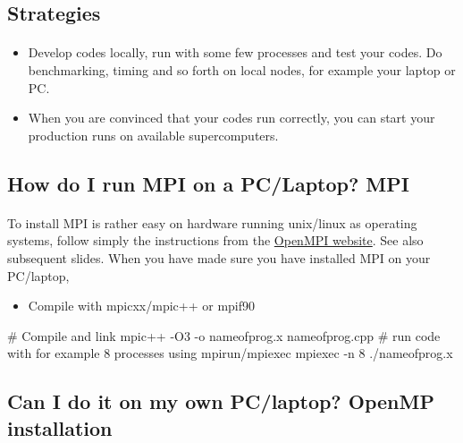 \documentclass[%
oneside,                 %
final,                   %
10pt]{article}
\begin{document}
\subsection{Strategies}

\paragraph{}
\begin{itemize}
\item Develop codes locally, run with some few processes and test your codes.  Do benchmarking, timing and so forth on local nodes, for example your laptop or PC. 

\item When you are convinced that your codes run correctly, you can start your production runs on available supercomputers.
\end{itemize}

\noindent



\subsection{How do I run MPI on a PC/Laptop? MPI}

\paragraph{}
To install MPI is rather easy on hardware running unix/linux as operating systems, follow simply the instructions from the \href{{https://www.open-mpi.org/}}{OpenMPI website}. See also subsequent slides.
When you have made sure you have installed MPI on your PC/laptop, 
\begin{itemize}
\item Compile with mpicxx/mpic++ or mpif90
\end{itemize}

\noindent





\bcppcod
  # Compile and link
  mpic++ -O3 -o nameofprog.x nameofprog.cpp
  #  run code with for example 8 processes using mpirun/mpiexec
  mpiexec -n 8 ./nameofprog.x

\ecppcod



\subsection{Can I do it on my own PC/laptop? OpenMP installation}
\end{document}

